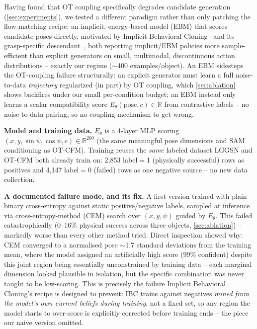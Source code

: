 \documentclass[journal]{IEEEtran}
\begin{document}
Having found that OT coupling specifically degrades candidate generation
(\cref{sec:experiments}), we tested a different paradigm rather than only
patching the flow-matching recipe: an implicit, energy-based model (EBM)
that scores candidate poses directly, motivated by Implicit Behavioral
Cloning~\cite{florence2021implicit} and its grasp-specific
descendant~\cite{singh2024cgdf}, both reporting implicit/EBM policies more
sample-efficient than explicit generators on small, multimodal,
discontinuous action distributions -- exactly our regime ($\sim$400
examples/object). An EBM sidesteps the OT-coupling failure structurally: an
explicit generator must learn a full noise-to-data \emph{trajectory}
regularized (in part) by OT coupling, which \cref{sec:ablation} shows
backfires under our small per-condition budget; an EBM instead only learns a
scalar compatibility score $E_\theta(\text{pose}, c) \in \mathbb{R}$ from
contrastive labels -- no noise-to-data pairing, so no coupling mechanism to
get wrong.

\noindent\textbf{Model and training data.} $E_\theta$ is a 4-layer MLP
scoring $(x, y, \sin\psi, \cos\psi, c) \in \mathbb{R}^{260}$ (the same
meaningful pose dimensions and SAM conditioning as OT-CFM). Training reuses
the \emph{same} labeled dataset LGGSN and OT-CFM both already train on: 2{,}853
label$=$1 (physically successful) rows as positives and 4{,}147 label$=$0
(failed) rows as one negative source -- no new data collection.

\noindent\textbf{A documented failure mode, and its fix.} A first version
trained with plain binary cross-entropy against static positive/negative
labels, sampled at inference via cross-entropy-method (CEM) search over
$(x,y,\psi)$ guided by $E_\theta$. This failed catastrophically (0--16\%
physical success across three objects, \cref{sec:ablation}) -- markedly
worse than every other method tried. Direct inspection showed why: CEM
converged to a normalised pose $\sim$1.7 standard deviations from the
training mean, where the model assigned an artificially high score (99\%
confident) despite this joint region being essentially unconstrained by
training data -- each marginal dimension looked plausible in isolation, but
the specific combination was never taught to be low-scoring. This is
precisely the failure Implicit Behavioral Cloning's recipe is designed to
prevent: IBC trains against negatives \emph{mined from the model's own
current beliefs during training}, not a fixed set, so any region the model
starts to over-score is explicitly corrected before training ends -- the
piece our naive version omitted.
\end{document}
